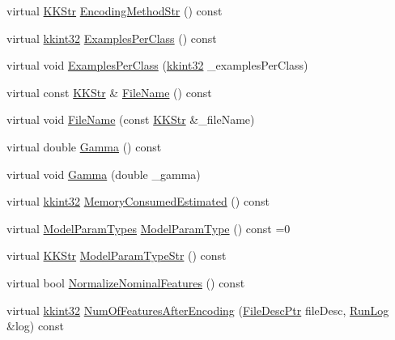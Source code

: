 \begin{DoxyCompactItemize}
\item 
virtual \hyperlink{class_k_k_b_1_1_k_k_str}{K\+K\+Str} \hyperlink{class_k_k_m_l_l_1_1_model_param_a02330a9a1bf6e5113bc659b9694e119b}{Encoding\+Method\+Str} () const 
\item 
virtual \hyperlink{namespace_k_k_b_a8fa4952cc84fda1de4bec1fbdd8d5b1b}{kkint32} \hyperlink{class_k_k_m_l_l_1_1_model_param_a84cad7375c43129ba19855444b6a8a68}{Examples\+Per\+Class} () const 
\item 
virtual void \hyperlink{class_k_k_m_l_l_1_1_model_param_af1a5178543690ecee6b470181965291b}{Examples\+Per\+Class} (\hyperlink{namespace_k_k_b_a8fa4952cc84fda1de4bec1fbdd8d5b1b}{kkint32} \+\_\+examples\+Per\+Class)
\item 
virtual const \hyperlink{class_k_k_b_1_1_k_k_str}{K\+K\+Str} \& \hyperlink{class_k_k_m_l_l_1_1_model_param_a43bf01844918b2c932d65c65f6eae283}{File\+Name} () const 
\item 
virtual void \hyperlink{class_k_k_m_l_l_1_1_model_param_ab9ff157ba831f2ad1db4b807aa6a8c12}{File\+Name} (const \hyperlink{class_k_k_b_1_1_k_k_str}{K\+K\+Str} \&\+\_\+file\+Name)
\item 
virtual double \hyperlink{class_k_k_m_l_l_1_1_model_param_ac128898ae19311796228c07e6a7923bd}{Gamma} () const 
\item 
virtual void \hyperlink{class_k_k_m_l_l_1_1_model_param_a9a368e6e7b7d8cbde615ce466fb61fa2}{Gamma} (double \+\_\+gamma)
\item 
virtual \hyperlink{namespace_k_k_b_a8fa4952cc84fda1de4bec1fbdd8d5b1b}{kkint32} \hyperlink{class_k_k_m_l_l_1_1_model_param_a42f2466be6458a51a73bf418b0b10a22}{Memory\+Consumed\+Estimated} () const 
\item 
virtual \hyperlink{class_k_k_m_l_l_1_1_model_param_a5984a5fe225fdbe8e40fb5ec746a42d0}{Model\+Param\+Types} \hyperlink{class_k_k_m_l_l_1_1_model_param_a5242ed04961c16c12068f02044af20a8}{Model\+Param\+Type} () const  =0
\item 
virtual \hyperlink{class_k_k_b_1_1_k_k_str}{K\+K\+Str} \hyperlink{class_k_k_m_l_l_1_1_model_param_a44132ad062b9b73b1e53959a282dfaea}{Model\+Param\+Type\+Str} () const 
\item 
virtual bool \hyperlink{class_k_k_m_l_l_1_1_model_param_ae84da9624f59dd8b1599cc5a1d3fe84d}{Normalize\+Nominal\+Features} () const 
\item 
virtual \hyperlink{namespace_k_k_b_a8fa4952cc84fda1de4bec1fbdd8d5b1b}{kkint32} \hyperlink{class_k_k_m_l_l_1_1_model_param_a0a426cc500915bff9fce6621b409d978}{Num\+Of\+Features\+After\+Encoding} (\hyperlink{namespace_k_k_m_l_l_aa0d0b6ab4ec18868a399b8455b05d914}{File\+Desc\+Ptr} file\+Desc, \hyperlink{class_k_k_b_1_1_run_log}{Run\+Log} \&log) const 

\end{DoxyCompactItemize}
